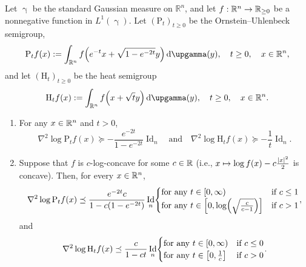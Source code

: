 \documentclass[10pt]{amsart}
\theoremstyle{definition}\newtheorem{defi}[theo]{Definition}\newtheorem{rema}[theo]{Remark}\newtheorem{exam}[theo]{Example}\newtheorem{exem}[theo]{Example}\newtheorem{nota}[theo]{Notation}
\newcommand{\R}{\mathbb R}
\DeclareMathOperator{\Id}{Id}
\newcommand{\Pheat}{\mathrm{P}}
\newcommand{\Hheat}{\mathrm{H}}
\newcommand{\dd}{n}
\newcommand{\conv}{c}
\newcommand{\density}{f}
\newcommand*\diff{\mathop{}\!\mathrm{d}}
\newcommand{\Gaussian}{\upgamma}
\renewcommand*{\to}{\mathchoice{\longrightarrow}{\rightarrow}{\rightarrow}{\rightarrow}}
\let\oldmapsto\mapsto
\renewcommand*{\mapsto}{\mathchoice{\longmapsto}{\oldmapsto}{\oldmapsto}{\oldmapsto}}
\let\originalleft\left
\let\originalright\right
\renewcommand{\left}{\mathopen{}\mathclose\bgroup\originalleft}
\renewcommand{\right}{\aftergroup\egroup\originalright}
\let\oldin\in
\renewcommand{\in}{\mathchoice{\oldin}{\oldin}{\,\oldin\,}{\,\oldin\,}}
\begin{document}
\begin{prop}\label{prop:OU_smooth_appendix}
Let $\Gaussian$ be the standard Gaussian measure on $\R^{\dd}$, and let $f:\R^{\dd}\to \R_{\ge 0}$ be a nonnegative function in $L^1(\Gaussian)$. Let $(\Pheat_t)_{t\ge 0}$ be the Ornstein--Uhlenbeck semigroup,
\begin{equation}\label{eq:OU_def_prop_appendix}
\Pheat_t\density(x):=\int_{\R^{\dd}} \density\left(e^{-t}x+\sqrt{1-e^{-2t}}y\right)\diff \Gaussian(y),\quad t\ge 0,\quad x\in \R^{\dd},
\end{equation}
and let $(\Hheat_t)_{t\ge 0}$ be the heat semigroup
\begin{equation}\label{eq:heat_def_prop_appendix}
\Hheat_t\density(x):=\int_{\R^{\dd}} \density\left(x+\sqrt{t}y\right)\diff \Gaussian(y),\quad t\ge 0,\quad x\in \R^{\dd}.
\end{equation}
\begin{enumerate}
\item\label{propA.2.1} For any $x\in \R^{\dd}$ and $t>0$,
\begin{equation}\label{eq:less_lc_appendix}
\nabla^2\log\Pheat_t\density(x) \succeq -\frac{e^{-2t}}{1-e^{-2t}} \Id_{\dd}\quad\text{and}\quad \nabla^2\log\Hheat_t\density(x) \succeq -\frac{1}{t}\Id_{\dd}.
\end{equation}
\item\label{propA.2.2} Suppose that $\density$ is $\conv$-log-concave for some $\conv\in \R$ (i.e., $x\mapsto \log \density(x)-\conv\frac{|x|^2}{2}$ is concave). Then, for every $x\in \R^{\dd}$,
\begin{equation}\label{eq:beta_log-concave_OU_appendix}
\nabla^2\log\Pheat_t\density(x)\preceq \frac{ e^{-2t}\conv}{1-\conv(1-e^{-2t})} \Id_{\dd}
\begin{cases}
\text{for any }t\in [0,\infty) &\text{if }\conv\le 1\\
\text{for any }t\in \left[0,\log\left(\sqrt{\frac{\conv}{\conv-1}}\right)\right] &\text{if }\conv >1
\end{cases},
\end{equation}
and
\begin{equation}\label{eq:beta_log-concave_heat_appendix}
\nabla^2\log\Hheat_t\density(x)\preceq \frac{\conv}{1-\conv t}\Id_{\dd}
\begin{cases}
\text{for any }t\in [0,\infty) &\text{if }\conv\le 0\\
\text{for any }t\in \left[0,\frac{1}{\conv}\right] &\text{if }\conv >0
\end{cases}.
\end{equation}


\end{enumerate}
\end{prop}
\end{document}
